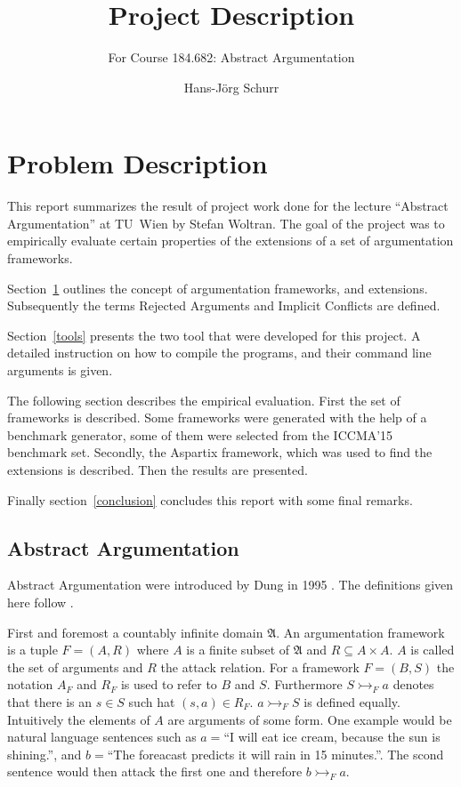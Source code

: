\documentclass[parskip=half]{scrartcl}
\title{Project Description}
\subtitle{For Course 184.682: Abstract Argumentation}
\author{Hans-Jörg Schurr}
\begin{document}
\maketitle
\tableofcontents

\section{Problem Description}
\label{problemdesc}
This report summarizes the result of project work done for the lecture
``Abstract Argumentation'' at TU~Wien by Stefan Woltran. The goal of the project
was to empirically evaluate certain properties of the extensions of a set of
argumentation frameworks.

Section~\ref{problemdesc} outlines the concept of argumentation frameworks, and
extensions. Subsequently the terms Rejected Arguments and Implicit Conflicts are
defined.

Section~\ref{tools} presents the two tool that were developed for this project.
A detailed instruction on how to compile the programs, and their command line
arguments is given.

The following section describes the empirical evaluation. First the set of
frameworks is described.  Some frameworks were generated with the help of a
benchmark generator, some of them were selected from the ICCMA'15 benchmark set.
Secondly, the Aspartix framework, which was used to find the extensions is
described. Then the results are presented.

Finally section~\ref{conclusion} concludes this report with some final remarks.

\subsection{Abstract Argumentation}
\label{aadef}
Abstract Argumentation were introduced by Dung in 1995 \cite{dung1995}. The
definitions given here follow \cite{linsbichler2015hidden}.

First and foremost a countably infinite domain $\mathfrak{A}$. An argumentation
framework is a tuple $F = (A,R)$ where $A$ is a finite subset of $\mathfrak{A}$
and $R \subseteq A\times A$.  $A$ is called the set of arguments and $R$ the
attack relation.  For a framework $F = (B, S)$ the notation $A_F$ and $R_F$ is
used to refer to $B$ and $S$. Furthermore $S \rightarrowtail_F a$ denotes that
there is an $s \in S$ such hat $(s, a) \in R_F$. $a \rightarrowtail_F S$ is
defined equally. Intuitively the elements of $A$ are arguments of some form.
One example would be natural language sentences such as $a=$``I will eat ice
cream, because the sun is shining.'', and $b=$``The foreacast predicts it will
rain in 15 minutes.''. The scond sentence would then attack the first one and
therefore $b \rightarrowtail_F a$.
\end{document}
